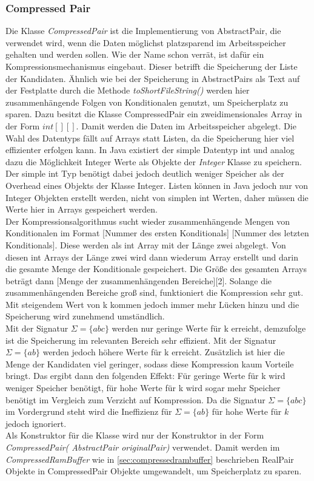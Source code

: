 \documentclass[12pt,a4paper]{article}
\begin{document}
\subsubsection{Compressed Pair}
Die Klasse  \textit{CompressedPair} ist die Implementierung von AbstractPair, die verwendet wird, wenn die Daten möglichst platzsparend im Arbeitsspeicher gehalten und werden sollen. Wie der Name schon verrät, ist dafür ein Kompressionsmechanismus eingebaut. Dieser betrifft die Speicherung der Liste der Kandidaten. Ähnlich wie bei der Speicherung in AbstractPairs als Text auf der Festplatte durch die Methode \textit{toShortFileString()} werden hier zusammenhängende Folgen von Konditionalen genutzt, um Speicherplatz zu sparen. Dazu besitzt die Klasse CompressedPair ein zweidimensionales Array in der Form $int[][]$. Damit werden die Daten im Arbeitsspeicher abgelegt. Die Wahl des Datentyps fällt auf Arrays statt Listen, da die Speicherung hier viel effizienter erfolgen kann. In Java existiert der simple Datentyp int und analog dazu die Möglichkeit Integer Werte als Objekte der \textit{Integer} Klasse zu speichern. Der simple int Typ benötigt dabei jedoch deutlich weniger Speicher als der Overhead eines Objekts der Klasse Integer. Listen können in Java jedoch nur von Integer Objekten erstellt werden, nicht von simplen int Werten, daher müssen die Werte hier in Arrays gespeichert werden.\\
Der Kompressionsalgorithmus sucht wieder zusammenhängende Mengen von Konditionalen im Format [Nummer des ersten Konditionals] [Nummer des letzten Konditionals]. Diese werden als int Array mit der Länge zwei abgelegt. Von diesen int Arrays der Länge zwei wird dann wiederum Array erstellt und darin die gesamte Menge der Konditionale gespeichert. Die Größe des gesamten Arrays beträgt dann [Menge der zusammenhängenden Bereiche][2]. Solange die zusammenhängenden Bereiche groß sind, funktioniert die Kompression sehr gut. Mit steigendem Wert von k kommen jedoch immer mehr Lücken hinzu und die Speicherung wird zunehmend umständlich. \\
Mit der Signatur $\Sigma=\{abc\}$ werden nur geringe Werte für k erreicht, demzufolge ist die Speicherung im relevanten Bereich sehr effizient. Mit der Signatur $\Sigma=\{ab\}$ werden jedoch höhere Werte für k erreicht. Zusätzlich ist hier die Menge der Kandidaten viel geringer, sodass diese Kompression kaum Vorteile bringt. Das ergibt dann den folgenden Effekt: Für geringe Werte für k wird weniger Speicher benötigt, für hohe Werte für k wird sogar mehr Speicher benötigt im Vergleich zum Verzicht auf Kompression. Da die Signatur  $\Sigma=\{abc\}$ im Vordergrund steht wird die Ineffizienz für $\Sigma=\{ab\}$ für hohe Werte für $k$  jedoch ignoriert.\\
Als Konstruktor für die Klasse wird nur der Konstruktor in der Form \textit{CompressedPair( AbstractPair originalPair)} verwendet. Damit werden im \textit{CompressedRamBuffer} wie in \autoref{sec:compressedrambuffer} beschrieben RealPair Objekte in CompressedPair Objekte umgewandelt, um Speicherplatz zu sparen.
\end{document}
